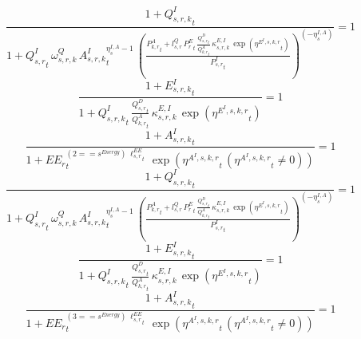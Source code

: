 \begin{dmath}
\frac{1+{{Q^{I}_{s,r,k}}}_{t}}{1+{{Q^{I}_{s,r}}}_{t}\, {{\omega^{Q}_{s,r,k}}}\, {{A^{I}_{s,r,k}}}_{t}^{{{\eta^{I,A}_{s}}}-1}\, \left(\frac{{{P^{A}_{k,r}}}_{t}+{{l^{Q}_{s,r}}}\, {{P^E_r}}_{t}\, \frac{{{Q^{D}_{s,r}}}_{t}}{{{Q^{A}_{k,r}}}_{t}}\, {{\kappa^{E,I}_{s,r,k}}}\, \exp\left({{\eta^{E^{I},s,k,r}}}_{t}\right)}{{{P^{I}_{s,r}}}_{t}}\right)^{\left(-{{\eta^{I,A}_{s}}}\right)}}=1
\end{dmath}
\noindent[name= `regional emissions caused by using intermediates from aggregate sector 2 1 2']
\begin{dmath}
\frac{1+{{E^I_{s,r,k}}}_{t}}{1+{{Q^{I}_{s,r,k}}}_{t}\, \frac{{{Q^{D}_{s,r}}}_{t}}{{{Q^{A}_{k,r}}}_{t}}\, {{\kappa^{E,I}_{s,r,k}}}\, \exp\left({{\eta^{E^{I},s,k,r}}}_{t}\right)}=1
\end{dmath}
\noindent[name= `productivity of intermediates in subsector 2 region 1 from sector 2']
\begin{dmath}
\frac{1+{{A^{I}_{s,r,k}}}_{t}}{1+{{EE_r}}_{t}^{\left(2=={{s^{Energy}}}\right)\, {{\ell^{EE}_{s,r}}}_{t}}\, \exp\left({{\eta^{A^{I},s,k,r}}}_{t}\, \left({{\eta^{A^{I},s,k,r}}}_{t}\neq 0\right)\right)}=1
\end{dmath}
\noindent[name= `regional sector demand for intermediates from aggregate sector 2 1 3']
\begin{dmath}
\frac{1+{{Q^{I}_{s,r,k}}}_{t}}{1+{{Q^{I}_{s,r}}}_{t}\, {{\omega^{Q}_{s,r,k}}}\, {{A^{I}_{s,r,k}}}_{t}^{{{\eta^{I,A}_{s}}}-1}\, \left(\frac{{{P^{A}_{k,r}}}_{t}+{{l^{Q}_{s,r}}}\, {{P^E_r}}_{t}\, \frac{{{Q^{D}_{s,r}}}_{t}}{{{Q^{A}_{k,r}}}_{t}}\, {{\kappa^{E,I}_{s,r,k}}}\, \exp\left({{\eta^{E^{I},s,k,r}}}_{t}\right)}{{{P^{I}_{s,r}}}_{t}}\right)^{\left(-{{\eta^{I,A}_{s}}}\right)}}=1
\end{dmath}
\noindent[name= `regional emissions caused by using intermediates from aggregate sector 2 1 3']
\begin{dmath}
\frac{1+{{E^I_{s,r,k}}}_{t}}{1+{{Q^{I}_{s,r,k}}}_{t}\, \frac{{{Q^{D}_{s,r}}}_{t}}{{{Q^{A}_{k,r}}}_{t}}\, {{\kappa^{E,I}_{s,r,k}}}\, \exp\left({{\eta^{E^{I},s,k,r}}}_{t}\right)}=1
\end{dmath}
\noindent[name= `productivity of intermediates in subsector 2 region 1 from sector 3']
\begin{dmath}
\frac{1+{{A^{I}_{s,r,k}}}_{t}}{1+{{EE_r}}_{t}^{\left(3=={{s^{Energy}}}\right)\, {{\ell^{EE}_{s,r}}}_{t}}\, \exp\left({{\eta^{A^{I},s,k,r}}}_{t}\, \left({{\eta^{A^{I},s,k,r}}}_{t}\neq 0\right)\right)}=1
\end{dmath}

